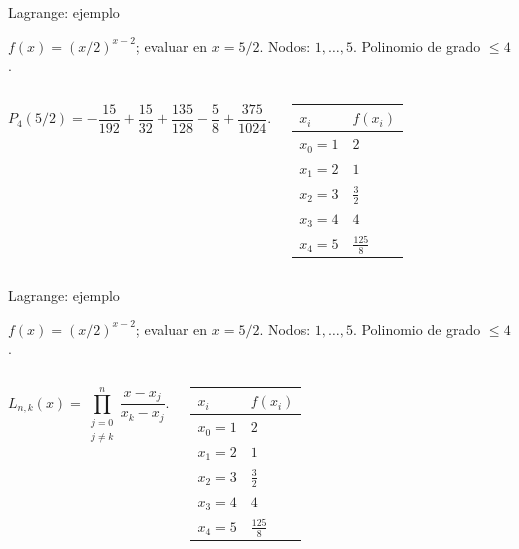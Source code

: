 \documentclass[main.tex]{subfiles}
\begin{document}
\begin{frame}[t]{Lagrange: ejemplo}
\par\noindent\begin{minipage}[t][7.5mm][t]{\textwidth}\small\strut $f(x)=(x/2)^{x-2}$; evaluar en $x=5/2$. Nodos: $1,\ldots,5$. Polinomio de grado $\le 4$.\end{minipage}\par\nointerlineskip
\begin{columns}[T]\small\setlength{\abovedisplayskip}{4pt}\setlength{\belowdisplayskip}{4pt}\small\[P_4(5/2)=-\frac{15}{192}+\frac{15}{32}+\frac{135}{128}-\frac58+\frac{375}{1024}.\]\begingroup\small\setlength{\tabcolsep}{3pt}\begin{center}\begin{tabular}{|C{.42\textwidth}|C{.42\textwidth}|}\hline
\rule[-2mm]{0pt}{6mm}$x_i$&$f(x_i)$\\\hline
\rule[-2.5mm]{0pt}{6mm}$x_0=1$&$2$\\\hline
\rule[-2.5mm]{0pt}{6mm}$x_1=2$&$1$\\\hline
\rule[-2.5mm]{0pt}{6mm}$x_2=3$&$\frac{3}{2}$\\\hline
\rule[-2.5mm]{0pt}{6mm}$x_3=4$&$4$\\\hline
\rule[-2.5mm]{0pt}{6mm}$x_4=5$&$\frac{125}{8}$\\\hline
\end{tabular}\end{center}\endgroup\par
\end{columns}
\end{frame}
\begin{frame}[t]{Lagrange: ejemplo}
\par\noindent\begin{minipage}[t][7.5mm][t]{\textwidth}\small\strut $f(x)=(x/2)^{x-2}$; evaluar en $x=5/2$. Nodos: $1,\ldots,5$. Polinomio de grado $\le 4$.\end{minipage}\par\nointerlineskip
\begin{columns}[T]\small\setlength{\abovedisplayskip}{4pt}\setlength{\belowdisplayskip}{4pt}\[L_{n,k}(x)=\prod_{\substack{j=0\\j\ne k}}^n\frac{x-x_j}{x_k-x_j}.\]\begingroup\small\setlength{\tabcolsep}{3pt}\begin{center}\begin{tabular}{|C{.42\textwidth}|C{.42\textwidth}|}\hline
\rule[-2mm]{0pt}{6mm}$x_i$&$f(x_i)$\\\hline
\rule[-2.5mm]{0pt}{6mm}$x_0=1$&$2$\\\hline
\rule[-2.5mm]{0pt}{6mm}$x_1=2$&$1$\\\hline
\rule[-2.5mm]{0pt}{6mm}$x_2=3$&$\frac{3}{2}$\\\hline
\rule[-2.5mm]{0pt}{6mm}$x_3=4$&$4$\\\hline
\rule[-2.5mm]{0pt}{6mm}$x_4=5$&$\frac{125}{8}$\\\hline
\end{tabular}\end{center}\endgroup\par
\end{columns}
\end{frame}
\end{document}
